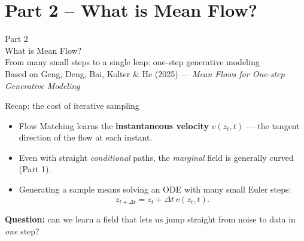 \documentclass{beamer}
\begin{document}
\section{Part 2 -- What is Mean Flow?}

\begin{frame}
\centering
{\Huge Part 2}\\[0.5em]
{\LARGE What is Mean Flow?}\\[1.5em]
\normalsize From many small steps to a single leap: one-step generative modeling\\[0.3em]
Based on Geng, Deng, Bai, Kolter \& He (2025) --- \textit{Mean Flows for One-step Generative Modeling}
\end{frame}

\begin{frame}{Recap: the cost of iterative sampling}
\begin{itemize}
\item Flow Matching learns the \textbf{instantaneous velocity} $v(z_t,t)$ --- the tangent direction of the flow at each instant.
\item Even with straight \emph{conditional} paths, the \emph{marginal} field is generally curved (Part 1).
\item Generating a sample means solving an ODE with many small Euler steps:
\[
z_{t+\Delta t} = z_t + \Delta t \, v(z_t,t).
\]
\end{itemize}
\begin{center}
\end{center}
\textbf{Question:} can we learn a field that lets us jump straight from noise to data in \emph{one} step?
\end{frame}
\end{document}
